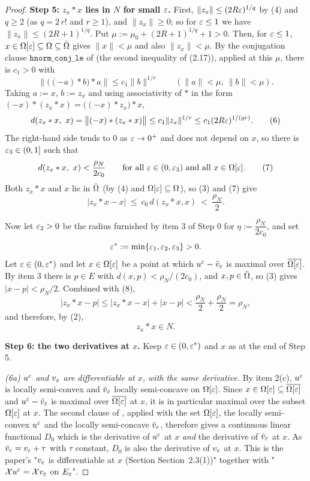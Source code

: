 \begin{proof}
\medskip\noindent\textbf{Step 5: $z_x*x$ lies in $N$ for small $\varepsilon$.} First,
$\|z_x\|\le(2R\varepsilon)^{1/q}$ by (4) and $q\ge2$ (as $q=2\,r!$ and $r\ge1$), and $\|z_x\|\ge0$;
so for $\varepsilon\le1$ we have $\|z_x\|\le(2R+1)^{1/q}$. Put
$\mu:=\mu_0+(2R+1)^{1/q}+1>0$. Then, for $\varepsilon\le1$, $x\in\Omega[\varepsilon]\subseteq\Omega\subseteq\bar{\Omega}$
gives $\|x\|<\mu$ and also $\|z_x\|<\mu$. By the conjugation clause $\mathtt{hnorm\_conj\_le}$
of  (the second inequality of (2.17)), applied at this $\mu$,
there is $c_1>0$ with
\[
 \Big\|\big((-a)*b\big)*a\Big\|\le c_1\|b\|^{1/r}\qquad(\|a\|<\mu,\ \|b\|<\mu).
\]
Taking $a:=x$, $b:=z_x$ and using associativity of $*$ in the form
$(-x)*(z_x*x)=\big((-x)*z_x\big)*x$,
\[
 d(z_x*x,\ x)=\big\|(-x)*(z_x*x)\big\|\le c_1\|z_x\|^{1/r}\le c_1(2R\varepsilon)^{1/(qr)} . \tag{6}
\]
The right-hand side tends to $0$ as $\varepsilon\to0^{+}$ and does not depend on $x$, so there is
$\varepsilon_3\in(0,1]$ such that
\[
 d(z_x*x,\ x)<\frac{\rho_N}{2c_0}\qquad\text{for all }\eps\in(0,\eps_3)\text{ and all }x\in\Om[\eps].
 \tag{7}
\]
Both $z_x*x$ and $x$ lie in $\bar{\Omega}$ (by (4) and $\Omega[\varepsilon]\subseteq\Omega$), so (3) and (7)
give
\[
 |z_x*x-x|\ \le\ c_0\,d(z_x*x,x)\ <\ \frac{\rho_N}2 . \tag{8}
\]

Now let $\varepsilon_2>0$ be the radius furnished by item 3 of Step 0 for
$\eta:=\dfrac{\rho_N}{2c_0}$, and set
\[
 \varepsilon^{*}:=\min\{\varepsilon_1,\varepsilon_2,\varepsilon_3\}>0 .
\]
Let $\varepsilon\in(0,\varepsilon^{*})$ and let $x\in\Omega[\varepsilon]$ be a point at which
$u^{\varepsilon}-\tilde v_{\varepsilon}$ is maximal over $\overline{\Omega[\varepsilon]}$. By item 3 there is $p\in E$
with $d(x,p)<\rho_N/(2c_0)$, and $x,p\in\bar{\Omega}$, so (3) gives $|x-p|<\rho_N/2$. Combined
with (8),
\[
 |z_x*x-p|\le|z_x*x-x|+|x-p|<\frac{\rho_N}2+\frac{\rho_N}2=\rho_N ,
\]
and therefore, by (2),
\[
 z_x*x\in N . \tag{9}
\]

\medskip\noindent\textbf{Step 6: the two derivatives at $x$.} Keep $\varepsilon\in(0,\varepsilon^{*})$ and
$x$ as at the end of Step 5.

\emph{(6a) $u^{\varepsilon}$ and $v_{\varepsilon}$ are differentiable at $x$, with the same derivative.}
By item 2(c), $u^{\varepsilon}$ is locally semi-convex and $\tilde v_{\varepsilon}$ locally semi-concave on
$\Omega[\varepsilon]$. Since $x\in\Omega[\varepsilon]\subseteq\overline{\Omega[\varepsilon]}$ and $u^{\varepsilon}-\tilde v_{\varepsilon}$
is maximal over $\overline{\Omega[\varepsilon]}$ at $x$, it is in particular maximal over the subset
$\Omega[\varepsilon]$ at $x$. The second clause of , applied with the set
$\Omega[\varepsilon]$, the locally semi-convex $u^{\varepsilon}$ and the locally semi-concave
$\tilde v_{\varepsilon}$, therefore gives a continuous linear functional $D_0$ which is the
derivative of $u^{\varepsilon}$ at $x$ \emph{and} the derivative of $\tilde v_{\varepsilon}$ at $x$. As
$\tilde v_{\varepsilon}=v_{\varepsilon}+\tau$ with $\tau$ constant, $D_0$ is also the derivative of
$v_{\varepsilon}$ at $x$. This is the paper's "$v_\varepsilon$ is differentiable at $x$ (Section
Section~2.3(1))" together with "$\mathcal Xu^{\varepsilon}=\mathcal Xv_{\varepsilon}$ on $E_\varepsilon$".


\end{proof}
